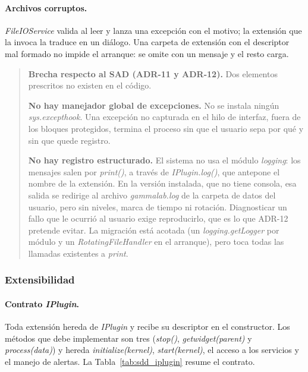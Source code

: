 \documentclass[12pt,letterpaper,oneside]{article}
\DeclareRobustCommand{\_}{\textunderscore\allowbreak}
\begin{document}
\paragraph{Archivos corruptos.} \textit{FileIOService} valida al leer y lanza una excepción con el motivo; la extensión que la invoca la traduce en un diálogo. Una carpeta de extensión con el descriptor mal formado no impide el arranque: se omite con un mensaje y el resto carga.

\begin{quote}
\textbf{Brecha respecto al SAD (ADR-11 y ADR-12).} Dos elementos prescritos no existen en el código.

\textbf{No hay manejador global de excepciones.} No se instala ningún \textit{sys.\allowbreak excepthook}. Una excepción no capturada en el hilo de interfaz, fuera de los bloques protegidos, termina el proceso sin que el usuario sepa por qué y sin que quede registro.

\textbf{No hay registro estructurado.} El sistema no usa el módulo \textit{logging}: los mensajes salen por \textit{print()}, a través de \textit{IPlugin.\_log()}, que antepone el nombre de la extensión. En la versión instalada, que no tiene consola, esa salida se redirige al archivo \textit{gamma\_lab.log} de la carpeta de datos del usuario, pero sin niveles, marca de tiempo ni rotación. Diagnosticar un fallo que le ocurrió al usuario exige reproducirlo, que es lo que ADR-12 pretende evitar. La migración está acotada (un \textit{logging.getLogger} por módulo y un \textit{RotatingFileHandler} en el arranque), pero toca todas las llamadas existentes a \textit{print}.
\end{quote}

\subsubsection{Extensibilidad}

\paragraph{Contrato \textit{IPlugin}.} Toda extensión hereda de \textit{IPlugin} y recibe su descriptor en el constructor. Los métodos que debe implementar son tres (\textit{stop()}, \textit{get\_widget(parent)} y \textit{process(data)}) y hereda \textit{initialize(kernel)}, \textit{start(kernel)}, el acceso a los servicios y el manejo de alertas. La Tabla~\ref{tab:sdd_iplugin} resume el contrato.
\end{document}
